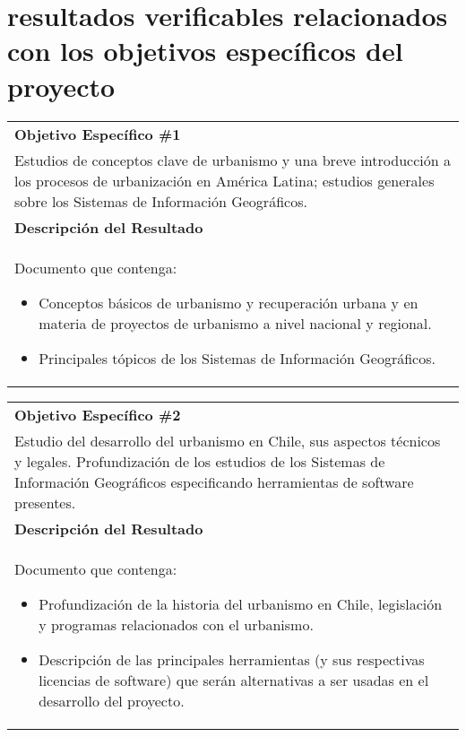 
\section{resultados verificables  relacionados con los objetivos específicos del
proyecto}

\begin{table}[H]
	\centering
	\begin{tabular}{|p{\textwidth}|}
        \hline
        \textbf{Objetivo Específico \#1}
        \\
        \vspace{0.5mm}
	 Estudios de conceptos clave de urbanismo y una breve introducción a los procesos de
    urbanización en América Latina; estudios generales sobre  
    los Sistemas de Información Geográficos.
        \\ \hline
        \textbf{Descripción del Resultado}
        \\
        \vspace{0.5mm}
        Documento que contenga:
        \begin{itemize}
            \item Conceptos básicos de urbanismo y recuperación
                urbana y en materia de proyectos de urbanismo a
                nivel nacional y regional.
            \item Principales tópicos de los Sistemas de Información
                Geográficos.
        \end{itemize}
        \\
        \hline
	\end{tabular}
\end{table}

\begin{table}[H]
	\centering
	\begin{tabular}{|p{\textwidth}|}
        \hline
        \textbf{Objetivo Específico \#2}
        \\
        \vspace{0.5mm}
	 Estudio del desarrollo del urbanismo en Chile, sus aspectos técnicos y legales.
    Profundización de los estudios de los Sistemas de Información Geográficos especificando
    herramientas de software presentes.
        \\ \hline
        \textbf{Descripción del Resultado}
        \\
        \vspace{0.5mm}
        Documento que contenga:
        \begin{itemize}
            \item Profundización de la historia del urbanismo en Chile, legislación y programas
              relacionados con el urbanismo.
            \item Descripción de las principales herramientas (y sus
                respectivas licencias de software) que serán
                alternativas a ser usadas en el desarrollo del
                proyecto.
        \end{itemize}
        \\
        \hline
	\end{tabular}
\end{table}

